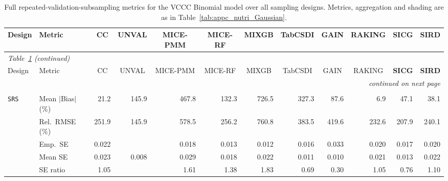 \begin{landscape}
\footnotesize\setlength{\tabcolsep}{3.5pt}
\begin{longtable}{llrrrrrrrrrr}
\caption{Full repeated-validation-subsampling metrics for the VCCC Binomial model over all sampling designs. Metrics, aggregation and shading are as in Table~\ref{tab:appc_nutri_Gaussian}.}
\label{tab:appc_vccc_LOGISTIC} \\
\toprule
Design & Metric & \multicolumn{1}{c}{CC} & \multicolumn{1}{c}{UNVAL} & \multicolumn{1}{c}{MICE-PMM} & \multicolumn{1}{c}{MICE-RF} & \multicolumn{1}{c}{MIXGB} & \multicolumn{1}{c}{TabCSDI} & \multicolumn{1}{c}{GAIN} & \multicolumn{1}{c}{RAKING} & \multicolumn{1}{c}{\textbf{SICG}} & \multicolumn{1}{c}{\textbf{SIRD}} \\
\midrule
\endfirsthead
\multicolumn{12}{l}{\footnotesize\itshape Table~\ref{tab:appc_vccc_LOGISTIC} (continued)} \\
\toprule
Design & Metric & \multicolumn{1}{c}{CC} & \multicolumn{1}{c}{UNVAL} & \multicolumn{1}{c}{MICE-PMM} & \multicolumn{1}{c}{MICE-RF} & \multicolumn{1}{c}{MIXGB} & \multicolumn{1}{c}{TabCSDI} & \multicolumn{1}{c}{GAIN} & \multicolumn{1}{c}{RAKING} & \multicolumn{1}{c}{\textbf{SICG}} & \multicolumn{1}{c}{\textbf{SIRD}} \\
\midrule
\endhead
\midrule \multicolumn{12}{r}{\footnotesize\itshape continued on next page} \\
\endfoot
\bottomrule
\endlastfoot
\multicolumn{12}{l}{\textbf{Continuous Phase-Two Covariates}} \\
\addlinespace[2pt]
\quad \texttt{SRS} & Mean $|$Bias$|$ (\%) & \cellcolor{ranktwo}21.2 & 145.9 & 467.8 & 132.3 & 726.5 & 327.3 & 87.6 & \cellcolor{rankone}6.9 & 47.1 & \cellcolor{rankthree}38.1 \\
 & Rel.\ RMSE (\%) & 251.9 & \cellcolor{rankone}145.9 & 578.5 & 256.2 & 760.8 & 383.5 & 419.6 & \cellcolor{rankthree}232.6 & \cellcolor{ranktwo}207.9 & 240.1 \\
 & Emp.\ SE & 0.022 &  & 0.018 & 0.013 & 0.012 & 0.016 & 0.033 & 0.020 & 0.017 & 0.020 \\
 & Mean SE & 0.023 & 0.008 & 0.029 & 0.018 & 0.022 & 0.011 & 0.010 & 0.021 & 0.013 & 0.022 \\
 & SE ratio & \cellcolor{rankone}1.05 &  & 1.61 & 1.38 & 1.83 & 0.69 & 0.30 & \cellcolor{rankone}1.05 & \cellcolor{rankthree}0.76 & \cellcolor{ranktwo}1.10 \\

\end{longtable}
\end{landscape}
